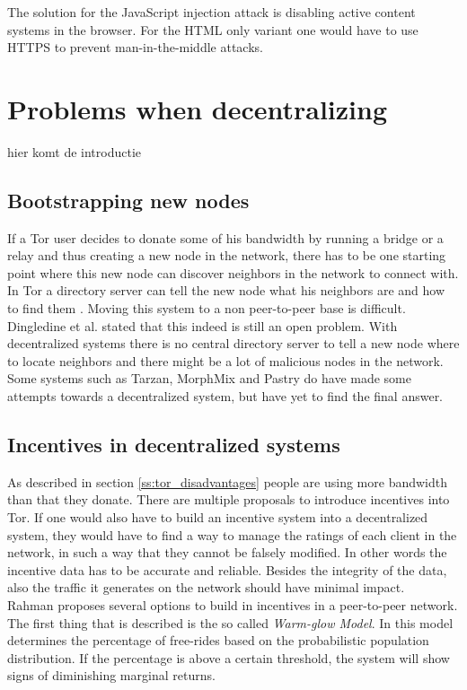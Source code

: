 \documentclass[journal]{IEEEtran}
\begin{document}
		The solution for the JavaScript injection attack is disabling active content systems in the browser. For the HTML only variant one would have to use HTTPS to prevent man-in-the-middle attacks.

\section{Problems when decentralizing}
		hier komt de introductie
		
			\subsection{Bootstrapping new nodes}
		If a Tor user decides to donate some of his bandwidth by running a bridge or a relay and thus creating a new node in the network, there has to be one starting point where this new node can discover neighbors in the network to connect with. In Tor a directory server can tell the new node what his neighbors are and how to find them \cite{dingledine2004tor}.
Moving this system to a non peer-to-peer base is difficult. Dingledine et al. stated that this indeed is still an open problem. With decentralized systems there is no central directory server to tell a new node where to locate neighbors and there might be a lot of malicious nodes in the network. Some systems such as Tarzan, MorphMix and Pastry \cite{rowstron2001pastry, rennhard2002introducing} do have made some attempts towards a decentralized system, but have yet to find the final answer.

		\subsection{Incentives in decentralized systems}
		As described in section \ref{ss:tor_disadvantages} people are using more bandwidth than that they donate. There are multiple proposals \cite{dingledine2010building, jansen13lira} to introduce incentives into Tor. If one would also have to build an incentive system into a decentralized system, they would have to find a way to manage the ratings of each client in the network, in such a way that they cannot be falsely modified. In other words the incentive data has to be accurate and reliable. Besides the integrity of the data, also the traffic it generates on the network should have minimal impact.\\
		
		Rahman \cite{rahman2009survey} proposes several options to build in incentives in a peer-to-peer network. The first thing that is described is the so called \emph{Warm-glow Model}. In this model determines the percentage of free-rides based on the probabilistic population distribution. If the percentage is above a certain threshold, the system will show signs of diminishing marginal returns.\\
		
\end{document}
